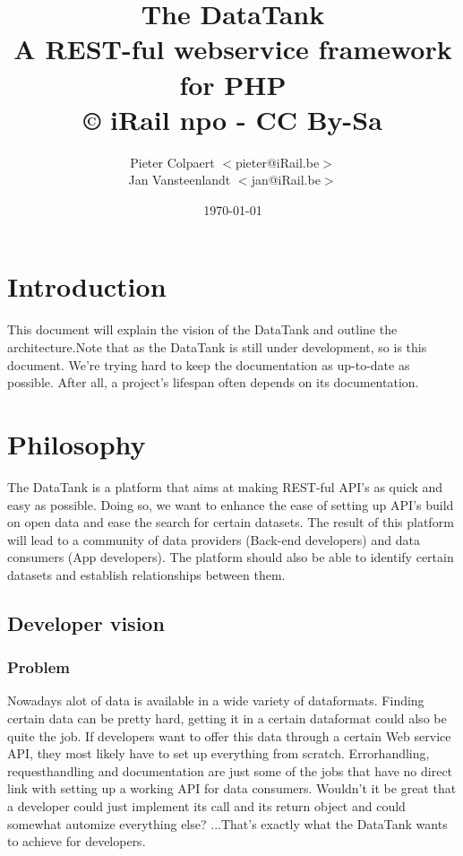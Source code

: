 \documentclass[12pt]{book}
\title{The DataTank\\
  \small A REST-ful webservice framework for PHP\\
  © iRail npo - CC By-Sa}
\author{
  Pieter Colpaert $<$pieter@iRail.be$>$\\
  Jan Vansteenlandt $<$jan@iRail.be$>$
}
\date{\today}
\begin{document}
\maketitle\setlength{\parindent}{0pt}
\setlength{\parskip}{1ex plus 0.5ex minus 0.2ex}

\thispagestyle{empty}
\tableofcontents





\chapter{Introduction}

This document will explain the vision of the DataTank and outline the architecture.Note that as the DataTank is still under development, so is this document. We're trying hard to keep the documentation as up-to-date as possible. After all, a project's lifespan often depends on its documentation.

\chapter{Philosophy}
The DataTank is a platform that aims at making REST-ful API's as quick and easy as possible. Doing so, we want to enhance the ease of setting up API's build on open data and ease the search for certain datasets. The result of this platform will lead to a community of data providers (Back-end developers) and data consumers (App developers). The platform should also be able to identify certain datasets and establish relationships between them.

\section{Developer vision}
\subsection{Problem}

Nowadays alot of data is available in a wide variety of dataformats. Finding certain data can be pretty hard, getting it in a certain dataformat could also be quite the job. If developers want to offer this data through a certain Web service API, they most likely have to set up everything from scratch. Errorhandling, requesthandling and documentation are just some of the jobs that have no direct link with setting up a working API for data consumers. Wouldn't it be great that a developer could just implement its call and its return object and could somewhat automize everything else? ...That's exactly what the DataTank wants to achieve for developers.
\end{document}

